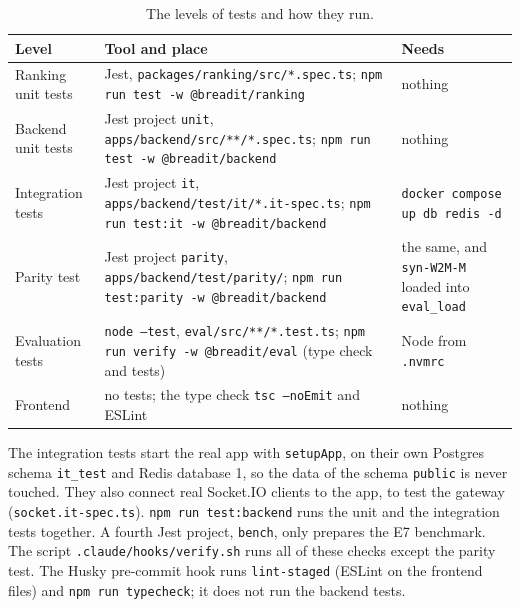 \begin{table}[htb]
  \centering
  \caption{The levels of tests and how they run.}
  \label{tab:impl-tests}
  \footnotesize
  \renewcommand{\arraystretch}{1.15}
  \begin{tabularx}{\textwidth}{@{}>{\raggedright\arraybackslash}p{3.1cm} >{\raggedright\arraybackslash}X >{\raggedright\arraybackslash}p{3.6cm}@{}}
    \toprule
    Level & Tool and place & Needs \\
    \midrule
    Ranking unit tests & Jest, \texttt{packages/ranking/src/*.spec.ts}; \texttt{npm run test -w @breadit/ranking} & nothing \\
    Backend unit tests & Jest project \texttt{unit}, \texttt{apps/backend/src/**/*.spec.ts}; \texttt{npm run test -w @breadit/backend} & nothing \\
    Integration tests & Jest project \texttt{it}, \texttt{apps/backend/test/it/*.it-spec.ts}; \texttt{npm run test:it -w @breadit/backend} & \texttt{docker compose up db redis -d} \\
    Parity test & Jest project \texttt{parity}, \texttt{apps/backend/test/parity/}; \texttt{npm run test:parity -w @breadit/backend} & the same, and \texttt{syn-W2M-M} loaded into \texttt{eval\_load} \\
    Evaluation tests & \texttt{node --test}, \texttt{eval/src/**/*.test.ts}; \texttt{npm run verify -w @breadit/eval} (type check and tests) & Node from \texttt{.nvmrc} \\
    Frontend & no tests; the type check \texttt{tsc --noEmit} and ESLint & nothing \\
    \bottomrule
  \end{tabularx}
\end{table}

The integration tests start the real app with \texttt{setupApp}, on their own Postgres schema \texttt{it\_test} and Redis database 1, so the data of the schema \texttt{public} is never touched. They also connect real Socket.IO clients to the app, to test the gateway (\texttt{socket.it-spec.ts}). \texttt{npm run test:backend} runs the unit and the integration tests together. A fourth Jest project, \texttt{bench}, only prepares the E7 benchmark. The script \texttt{.claude/hooks/verify.sh} runs all of these checks except the parity test. The Husky pre-commit hook runs \texttt{lint-staged} (ESLint on the frontend files) and \texttt{npm run typecheck}; it does not run the backend tests.
\setlength{\emergencystretch}{0pt}
\renewcommand{\topfraction}{0.7}
\renewcommand{\bottomfraction}{0.3}
\renewcommand{\textfraction}{0.2}
\renewcommand{\floatpagefraction}{0.5}
